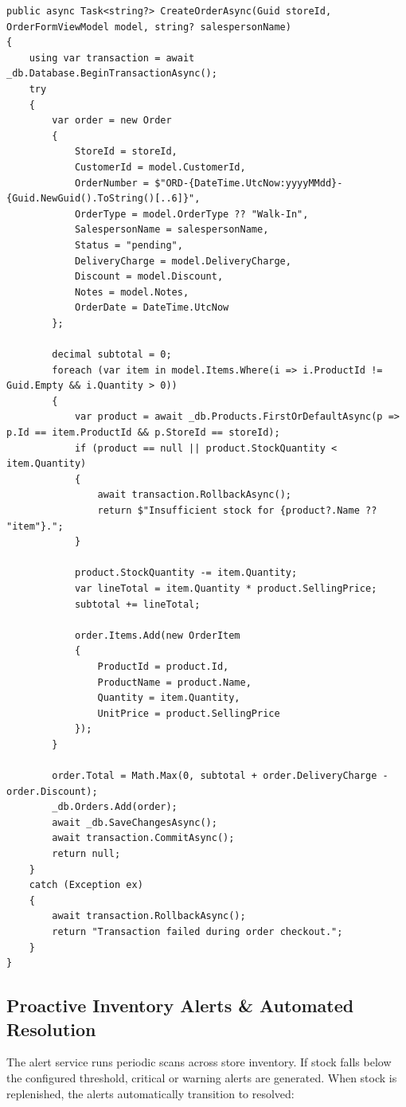 \documentclass[12pt,a4paper]{report}
\begin{document}
\begin{lstlisting}[language={[Sharp]C}]
public async Task<string?> CreateOrderAsync(Guid storeId, OrderFormViewModel model, string? salespersonName)
{
    using var transaction = await _db.Database.BeginTransactionAsync();
    try
    {
        var order = new Order
        {
            StoreId = storeId,
            CustomerId = model.CustomerId,
            OrderNumber = $"ORD-{DateTime.UtcNow:yyyyMMdd}-{Guid.NewGuid().ToString()[..6]}",
            OrderType = model.OrderType ?? "Walk-In",
            SalespersonName = salespersonName,
            Status = "pending",
            DeliveryCharge = model.DeliveryCharge,
            Discount = model.Discount,
            Notes = model.Notes,
            OrderDate = DateTime.UtcNow
        };

        decimal subtotal = 0;
        foreach (var item in model.Items.Where(i => i.ProductId != Guid.Empty && i.Quantity > 0))
        {
            var product = await _db.Products.FirstOrDefaultAsync(p => p.Id == item.ProductId && p.StoreId == storeId);
            if (product == null || product.StockQuantity < item.Quantity)
            {
                await transaction.RollbackAsync();
                return $"Insufficient stock for {product?.Name ?? "item"}.";
            }

            product.StockQuantity -= item.Quantity;
            var lineTotal = item.Quantity * product.SellingPrice;
            subtotal += lineTotal;

            order.Items.Add(new OrderItem
            {
                ProductId = product.Id,
                ProductName = product.Name,
                Quantity = item.Quantity,
                UnitPrice = product.SellingPrice
            });
        }

        order.Total = Math.Max(0, subtotal + order.DeliveryCharge - order.Discount);
        _db.Orders.Add(order);
        await _db.SaveChangesAsync();
        await transaction.CommitAsync();
        return null;
    }
    catch (Exception ex)
    {
        await transaction.RollbackAsync();
        return "Transaction failed during order checkout.";
    }
}
\end{lstlisting}

\subsection{Proactive Inventory Alerts \& Automated Resolution}
The alert service runs periodic scans across store inventory. If stock falls below the configured threshold, critical or warning alerts are generated. When stock is replenished, the alerts automatically transition to resolved:
\end{document}
